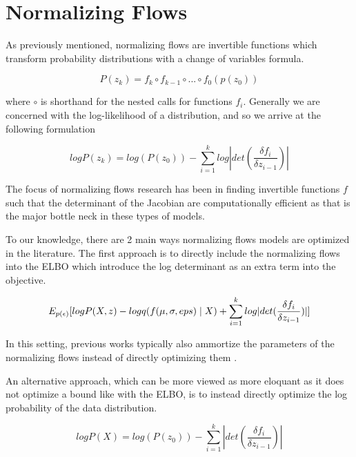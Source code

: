 \section{Normalizing Flows}

As previously mentioned, normalizing flows are invertible functions which transform probability distributions with a change of variables formula.

\begin{equation}
	P(z_{k}) = f_{k} \circ f_{k-1} \circ ... \circ f_{0}(p(z_{0}))
\end{equation} 

where $\circ$ is shorthand for the nested calls for functions $f_{i}$. Generally we are concerned with the log-likelihood of a distribution, and so we arrive at the following formulation



\begin{equation}
	logP(z_{k}) = log(P(z_{0})) - \sum_{i=1}^{k} log |det (\frac{\delta f_{i}}{\delta z_{i-1}}) |
\end{equation}

The focus of normalizing flows research has been in finding invertible functions $f$ such that the determinant of the Jacobian are computationally efficient as that is the major bottle neck in these types of models. 

To our knowledge, there are 2 main ways normalizing flows models are optimized in the literature. The first approach is to directly include the normalizing flows into the \ac{ELBO} which introduce the log determinant as an extra term into the objective.

\begin{equation}
E_{p(\epsilon)} [ log P(X, z) - log q( f(\mu, \sigma, eps) \; | \;{X}) + \sum_{i=1}^{k}log |det (\frac{\delta f_{i}}{\delta z_{i-1}}) | ]
\end{equation}

In this setting, previous works typically also ammortize the parameters of the normalizing flows instead of directly optimizing them  \cite{rezende2015VIwithNF,tomczak2016Householder,vdberg2018sylvester}. 

An alternative approach, which can be more viewed as more eloquant as it does not optimize a bound like with the \ac{ELBO}, is to instead directly optimize the log probability of the data distribution.
 
\begin{equation}
	logP(X) = log(P(z_{0})) - \sum_{i=1}^{k} |det (\frac{\delta f_{i}}{\delta z_{i-1}}) |
\end{equation}

